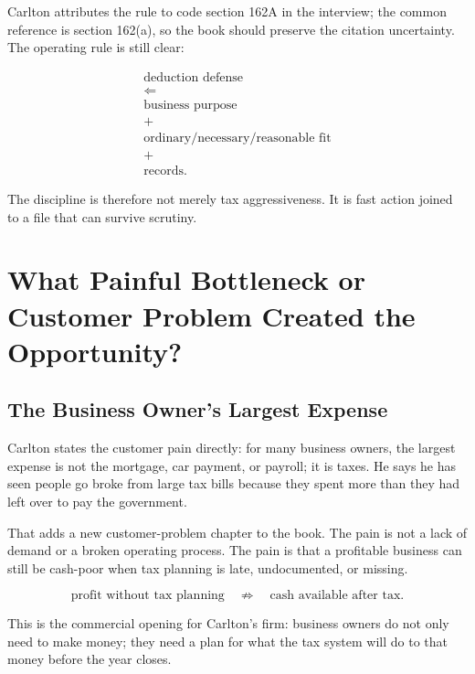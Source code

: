 \documentclass[11pt,oneside]{book}
\begin{document}
Carlton attributes the rule to code section 162A in the interview; the common reference is section 162(a), so the book should preserve the citation uncertainty. The operating rule is still clear:

\begin{equation}
\begin{gathered}
\text{deduction defense}\\
\Longleftarrow\\
\text{business purpose}\\
+\\
\text{ordinary/necessary/reasonable fit}\\
+\\
\text{records}.
\end{gathered}
\end{equation}

The discipline is therefore not merely tax aggressiveness. It is fast action joined to a file that can survive scrutiny.

\chapter{What Painful Bottleneck or Customer Problem Created the Opportunity?}

\section{The Business Owner's Largest Expense}

Carlton states the customer pain directly: for many business owners, the largest expense is not the mortgage, car payment, or payroll; it is taxes. He says he has seen people go broke from large tax bills because they spent more than they had left over to pay the government.

That adds a new customer-problem chapter to the book. The pain is not a lack of demand or a broken operating process. The pain is that a profitable business can still be cash-poor when tax planning is late, undocumented, or missing.

\begin{equation}
\text{profit without tax planning}
\quad\not\Rightarrow\quad
\text{cash available after tax}.
\end{equation}

This is the commercial opening for Carlton's firm: business owners do not only need to make money; they need a plan for what the tax system will do to that money before the year closes.
\end{document}
